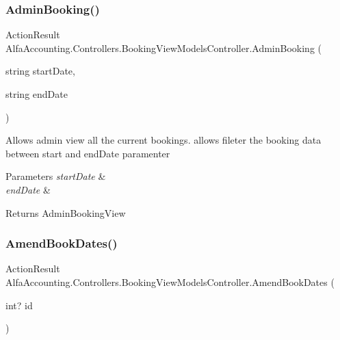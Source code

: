 \subsubsection{\texorpdfstring{Admin\+Booking()}{AdminBooking()}}
{\footnotesize\ttfamily Action\+Result Alfa\+Accounting.\+Controllers.\+Booking\+View\+Models\+Controller.\+Admin\+Booking (\begin{DoxyParamCaption}\item[{string}]{start\+Date,  }\item[{string}]{end\+Date }\end{DoxyParamCaption})}



Allows admin view all the current bookings. allows fileter the booking data between start and end\+Date paramenter 


\begin{DoxyParams}{Parameters}
{\em start\+Date} & \\
\hline
{\em end\+Date} & \\
\hline
\end{DoxyParams}
\begin{DoxyReturn}{Returns}
Admin\+Booking\+View
\end{DoxyReturn}
\mbox{\label{class_alfa_accounting_1_1_controllers_1_1_booking_view_models_controller_a0e2390ab528b31f0e6f08cb2e1e3b4d6}} 
\subsubsection{\texorpdfstring{Amend\+Book\+Dates()}{AmendBookDates()}\hspace{0.1cm}{\footnotesize\ttfamily [1/2]}}
{\footnotesize\ttfamily Action\+Result Alfa\+Accounting.\+Controllers.\+Booking\+View\+Models\+Controller.\+Amend\+Book\+Dates (\begin{DoxyParamCaption}\item[{int?}]{id }\end{DoxyParamCaption})}



